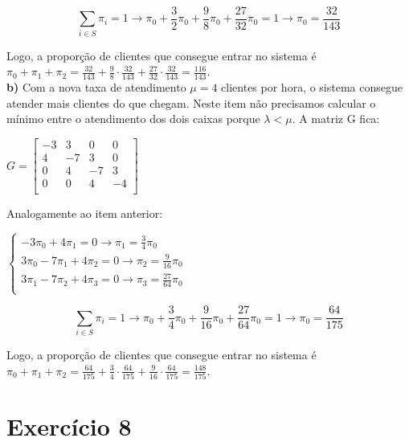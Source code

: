 \documentclass[12pt]{article}
\begin{document}
	\begin{equation*}
		\sum_{i \in S} \pi_i = 1 \to \pi_0 + \frac{3}{2} \pi_0 + \frac{9}{8} \pi_0 + \frac{27}{32} \pi_0 = 1 \to \pi_0 = \frac{32}{143}
	\end{equation*}
	
	Logo, a proporção de clientes que consegue entrar no sistema é $ \pi_0 + \pi_1 + \pi_2 = \frac{32}{143} + \frac{9}{8} \cdot \frac{32}{143} + \frac{27}{32} \cdot \frac{32}{143} = \frac{116}{143}$. \\
	
	\textbf{b)} Com a nova taxa de atendimento $ \mu = 4 $ clientes por hora, o sistema consegue atender mais clientes do que chegam. Neste item não precisamos calcular o mínimo entre o atendimento dos dois caixas porque $ \lambda < \mu $. A matriz G fica: 
	
	\begin{center}
		$
		G = \left[\begin{array}{cccc}
			-3 & 3  & 0   & 0  \\
			4  & -7 & 3   & 0  \\
			0  & 4  & -7  & 3  \\
			0  & 0  & 4   & -4 \\ 
		\end{array}\right]
		$
	\end{center}
	
	Analogamente ao item anterior:
	
		$ \begin{cases}
		-3 \pi_0 + 4 \pi_1 = 0 \to \pi_1 = \frac{3}{4} \pi_0\\
		3 \pi_0 -7 \pi_1 + 4 \pi_2 = 0 \to \pi_2 = \frac{9}{16} \pi_0\\
		3 \pi_1 -7 \pi_2 + 4 \pi_3 = 0 \to \pi_3 = \frac{27}{64} \pi_0\\
		\end{cases} $
		
		\begin{equation*}
		\sum_{i \in S} \pi_i = 1 \to \pi_0 + \frac{3}{4} \pi_0 + \frac{9}{16} \pi_0 + \frac{27}{64} \pi_0 = 1 \to \pi_0 = \frac{64}{175}
		\end{equation*}
		
		Logo, a proporção de clientes que consegue entrar no sistema é $ \pi_0 + \pi_1 + \pi_2 = \frac{64}{175} + \frac{3}{4} \cdot \frac{64}{175} + \frac{9}{16} \cdot \frac{64}{175} = \frac{148}{175}$.
	
	\section*{Exercício 8}
	
\end{document}
